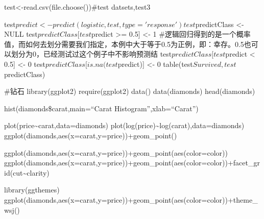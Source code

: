 \documentclass[
]{article}
\begin{document}
test\textless-read.csv(file.choose())\#test datsets,test3

test\(predict <- predict(logistic, test, type='response') test\)predictClass
\textless- NULL test\(predictClass[test\)predict \textgreater= 0.5{]}
\textless- 1
\#逻辑回归得到的是一个概率值，而如何去划分需要我们指定，本例中大于等于0.5为正例，即：幸存。0.5也可以划分为0，已经测试过这个例子中不影响预测结
test\(predictClass[test\)predict \textless{} 0.5{]} \textless- 0
test\(predictClass[is.na(test\)predict){]} \textless- 0
table(test\(Survived, test\)predictClass)

\#钻石 library(ggplot2) require(ggplot2) data() data(diamonds)
head(diamonds)

hist(diamonds\$carat,main=``Carat Histogram'',xlab=``Carat'')

plot(price\textasciitilde carat,data=diamonds)
plot(log(price)\textasciitilde log(carat),data=diamonds)
ggplot(diamonds,aes(x=carat,y=price))+geom\_point()

ggplot(diamonds,aes(x=carat,y=price))+geom\_point(aes(color=color))
ggplot(diamonds,aes(x=carat,y=price))+geom\_point(aes(color=color))+facet\_grid(cut\textasciitilde clarity)

library(ggthemes)
ggplot(diamonds,aes(x=carat,y=price))+geom\_point(aes(color=color))+theme\_wsj()
\end{document}
